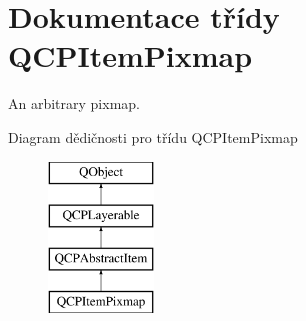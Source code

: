 \hypertarget{classQCPItemPixmap}{}\section{Dokumentace třídy Q\+C\+P\+Item\+Pixmap}
\label{classQCPItemPixmap}


An arbitrary pixmap.  


Diagram dědičnosti pro třídu Q\+C\+P\+Item\+Pixmap\begin{figure}[H]
\begin{center}
\leavevmode
\includegraphics[height=4.000000cm]{classQCPItemPixmap}
\end{center}
\end{figure}
